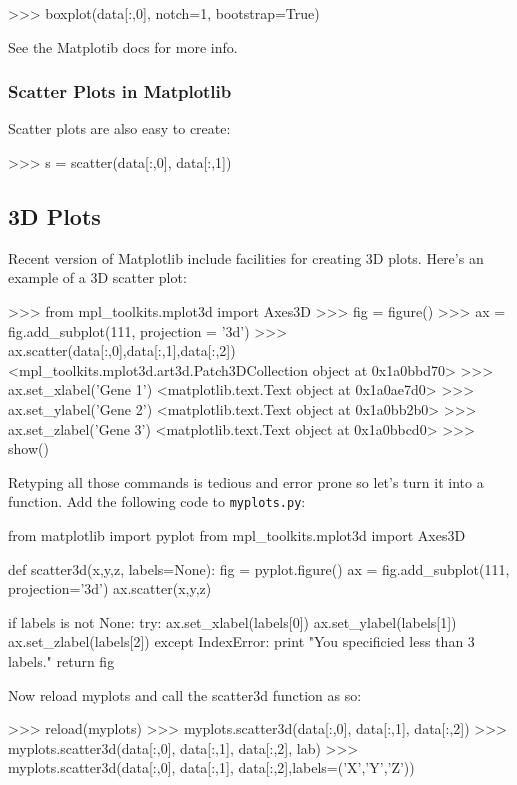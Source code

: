 \begin{python}
>>> boxplot(data[:,0], notch=1, bootstrap=True)    
\end{python}
See the Matplotib docs for more info.

\subsubsection{Scatter Plots in Matplotlib}

Scatter plots are also easy to create:

\begin{python}
>>> s = scatter(data[:,0], data[:,1])    
\end{python}
\subsection{3D Plots}

Recent version of Matplotlib include facilities for creating 3D plots.
Here's an example of a 3D scatter plot:

\begin{python}
>>> from mpl_toolkits.mplot3d import Axes3D
>>> fig = figure()
>>> ax = fig.add_subplot(111, projection = '3d')
>>> ax.scatter(data[:,0],data[:,1],data[:,2])
<mpl_toolkits.mplot3d.art3d.Patch3DCollection object at 0x1a0bbd70>
>>> ax.set_xlabel('Gene 1')
<matplotlib.text.Text object at 0x1a0ae7d0>
>>> ax.set_ylabel('Gene 2')
<matplotlib.text.Text object at 0x1a0bb2b0>
>>> ax.set_zlabel('Gene 3')
<matplotlib.text.Text object at 0x1a0bbcd0>
>>> show()
\end{python}
Retyping all those commands is tedious and error prone so let's turn it
into a function. Add the following code to \lstinline!myplots.py!:

\begin{python}
from matplotlib import pyplot
from mpl_toolkits.mplot3d import Axes3D

def scatter3d(x,y,z, labels=None):
    fig = pyplot.figure()
    ax = fig.add_subplot(111, projection='3d')
    ax.scatter(x,y,z)

    if labels is not None:
        try:
            ax.set_xlabel(labels[0])
            ax.set_ylabel(labels[1])
            ax.set_zlabel(labels[2])
        except IndexError:
            print "You specificied less than 3 labels."
    return fig
\end{python}
Now reload myplots and call the scatter3d function as so:

\begin{python}
>>> reload(myplots)
>>> myplots.scatter3d(data[:,0], data[:,1], data[:,2])
>>> myplots.scatter3d(data[:,0], data[:,1], data[:,2], lab)
>>> myplots.scatter3d(data[:,0], data[:,1], data[:,2],labels=('X','Y','Z'))
\end{python}
